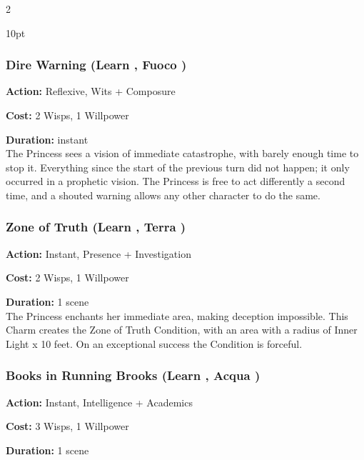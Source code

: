 \begin{multicols}{2}
\begin{myindentpar}{10pt}
	\end{myindentpar}

\subsubsection*{Dire Warning (Learn \textbullet\textbullet\textbullet\textbullet, Fuoco \textbullet\textbullet\textbullet)}

\noindent \textbf{Action:} Reflexive, Wits + Composure

\noindent \textbf{Cost:} 2 Wisps, 1 Willpower

\noindent \textbf{Duration:} instant \\

\noindent The Princess sees a vision of immediate catastrophe, with barely enough time to stop it. Everything since the start of the previous turn did not happen; it only occurred in a prophetic vision. The Princess is free to act differently a second time, and a shouted warning allows any other character to do the same.

\subsubsection*{Zone of Truth (Learn \textbullet\textbullet\textbullet\textbullet, Terra \textbullet\textbullet\textbullet)}

\noindent \textbf{Action:} Instant, Presence + Investigation

\noindent \textbf{Cost:} 2 Wisps, 1 Willpower

\noindent \textbf{Duration:} 1 scene \\

\noindent The Princess enchants her immediate area, making deception impossible. This Charm creates the Zone of Truth Condition, with an area with a radius of Inner Light x 10 feet. On an exceptional success the Condition is forceful. 

\subsubsection*{Books in Running Brooks (Learn \textbullet\textbullet\textbullet\textbullet\textbullet, Acqua \textbullet\textbullet\textbullet\textbullet)}

\noindent \textbf{Action:} Instant, Intelligence + Academics

\noindent \textbf{Cost:} 3 Wisps, 1 Willpower

\noindent \textbf{Duration:} 1 scene \\


\end{multicols}
